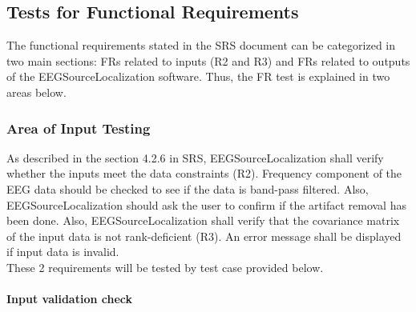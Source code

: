 \documentclass[12pt, titlepage]{article}
\renewcommand{\progname}{EEGSourceLocalization}
\begin{document}
\subsection{Tests for Functional Requirements}

The functional requirements stated in the SRS document can be categorized in two main sections: FRs related to inputs (R2 and R3) and FRs related to outputs of the \progname{} software. Thus, the FR test is explained in two areas below.

%

\subsubsection{Area of Input Testing}

As described in the section 4.2.6 in SRS, \progname{}  shall verify whether the inputs meet the data constraints (R2). Frequency component of the EEG data should be checked to see if the data is band-pass filtered. Also, \progname{}  should ask the user to confirm if the artifact removal has been done. Also, \progname{} shall verify that the covariance matrix of the input data is not rank-deficient (R3). An error message shall be displayed if input data is invalid.\\
These 2 requirements will be tested by test case provided below.


\paragraph{Input validation check}
\end{document}
